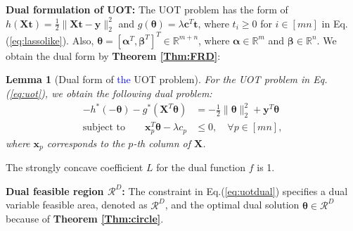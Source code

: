\documentclass[twoside]{article}
\theoremstyle{plain}
\newtheorem{lem}[thm]{Lemma}
\newcommand{\R}{\mathbb{R}}
\newcommand{\mat}[1]{\mathbf{#1}}
\renewcommand{\vec}[1]{\bm{#1}}
\newcommand{\changeXS}[1]{\textcolor{blue}{#1}}
\begin{document}
{\bf Dual formulation of UOT:} The UOT problem has the form of
$h(\mat{X} \vec{t}) = \frac{1}{2}\|\mat{X} \vec{t}-\vec{y}\|_2^2$ and $g(\vec{\theta})=\lambda \vec{c}^{T}\vec{t}$, where $t_i \geq 0$ for $i \in [mn]$ in Eq.(\ref{eq:lassolike}). Also, $\vec{\theta} = [\vec{\alpha}^T,\vec{\beta}^T]^T \in \mathbb{R}^{m+n}$, where $\vec{\alpha}\in\R^{m}$ and $\vec{\beta}\in\R^{n}$. We obtain the dual form by {\bf Theorem \ref{Thm:FRD}}:
\begin{lem}[Dual form of \changeXS{the} UOT problem]
For the UOT problem in Eq.(\ref{eq:uot}), we obtain the following dual problem:
\begin{equation}
\begin{split}
-h^*(-\vec{\theta}) - g^*(\mat{X}^T\vec{\theta})& = -\frac{1}{2}\|\vec{\theta}\|_2^2+\vec{y}^T\vec{\theta} \\
\text{subject\ to} \quad \quad \vec{x}_p^T\vec{\theta} -\lambda c_p &\leq 0, \quad \forall p \in [mn],
\end{split}
\label{eq:uotdual}
\end{equation}
where $\vec{x}_p $ corresponds to the $p$-th column of $\mat{X}$.
\end{lem}
The strongly concave coefficient $L$ for the dual function $f$ is 1. 

{\bf Dual feasible region $\mathcal{R}^D$:} 
The constraint in Eq.(\ref{eq:uotdual}) specifies a dual variable feasible area, denoted as $\mathcal{R}^{D}$, and the optimal dual solution $\hat{\vec{\theta}} \in \mathcal{R}^{D}$ because of {\bf Theorem \ref{Thm:circle}}.
\end{document}
